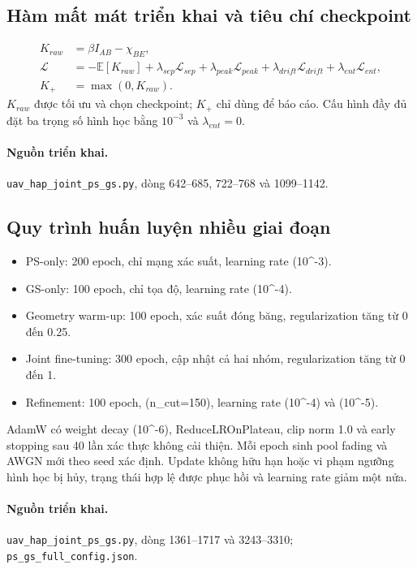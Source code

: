 \subsection{Hàm mất mát triển khai và tiêu chí checkpoint}

\begin{align}
K_{raw}&=\beta I_{AB}-\chi_{BE},\\
\mathcal L&=-\mathbb E[K_{raw}]
+\lambda_{sep}\mathcal L_{sep}+\lambda_{peak}\mathcal L_{peak}
+\lambda_{drift}\mathcal L_{drift}+\lambda_{ent}\mathcal L_{ent},\\
K_+&=\max(0,K_{raw}).
\end{align}
\(K_{raw}\) được tối ưu và chọn checkpoint; \(K_+\) chỉ dùng để báo cáo. Cấu hình đầy đủ đặt ba trọng số hình học bằng \(10^{-3}\) và \(\lambda_{ent}=0\).

\paragraph{Nguồn triển khai.} \texttt{uav\_hap\_joint\_ps\_gs.py}, dòng 642--685, 722--768 và 1099--1142.

\subsection{Quy trình huấn luyện nhiều giai đoạn}

\begin{itemize}
\item PS-only: 200 epoch, chỉ mạng xác suất, learning rate (10^{-3}).
\item GS-only: 100 epoch, chỉ tọa độ, learning rate (10^{-4}).
\item Geometry warm-up: 100 epoch, xác suất đóng băng, regularization tăng từ 0 đến 0.25.
\item Joint fine-tuning: 300 epoch, cập nhật cả hai nhóm, regularization tăng từ 0 đến 1.
\item Refinement: 100 epoch, (n_{cut}=150), learning rate (10^{-4}) và (10^{-5}).
\end{itemize}
AdamW có weight decay (10^{-6}), ReduceLROnPlateau, clip norm 1.0 và early stopping sau 40 lần xác thực không cải thiện. Mỗi epoch sinh pool fading và AWGN mới theo seed xác định. Update không hữu hạn hoặc vi phạm ngưỡng hình học bị hủy, trạng thái hợp lệ được phục hồi và learning rate giảm một nửa.

\paragraph{Nguồn triển khai.} \texttt{uav\_hap\_joint\_ps\_gs.py}, dòng 1361--1717 và 3243--3310; \texttt{ps\_gs\_full\_config.json}.

